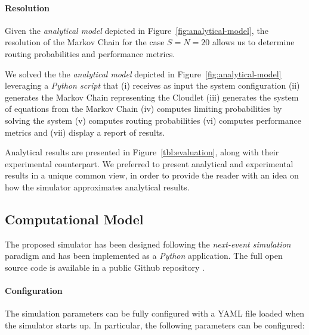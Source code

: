 \paragraph{Resolution}
Given the \textit{analytical model} depicted in Figure~\ref{fig:analytical-model}, the resolution of the Markov Chain for the case $S=N=20$ allows us to determine routing probabilities and performance metrics.

We solved the the \textit{analytical model} depicted in Figure~\ref{fig:analytical-model} leveraging a \textit{Python script} that 
(i) receives as input the system configuration
(ii) generates the Markov Chain representing the Cloudlet
(iii) generates the system of equations from the Markov Chain
(iv) computes limiting probabilities by solving the system
(v) computes routing probabilities
(vi) computes performance metrics and
(vii) display a report of results.

Analytical results are presented in Figure~\ref{tbl:evaluation}, along with their experimental counterpart.
%
We preferred to present analytical and experimental results in a unique common view, in order to provide the reader with an idea on how the simulator approximates analytical results.


\subsection{Computational Model}
The proposed simulator has been designed following the \textit{next-event simulation} paradigm and has been implemented as a \textit{Python} application. The full open source code is available in a public Github repository \cite{gmarciani-pydes}.

\paragraph{Configuration}
The simulation parameters can be fully configured with a YAML file loaded when the simulator starts up. In particular, the following parameters can be configured:

